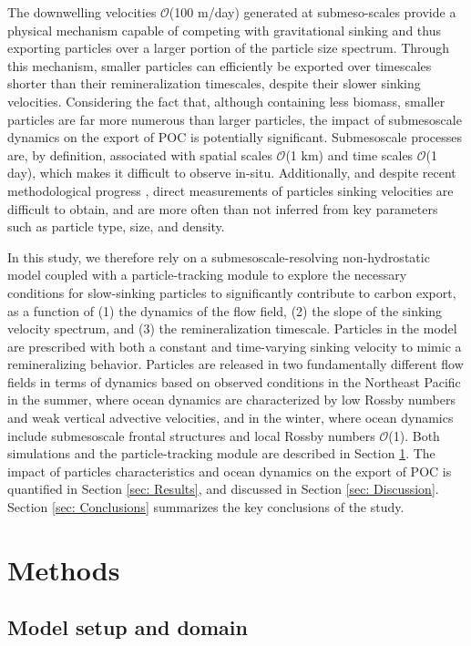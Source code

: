 \documentclass[draft,linenumbers]{agujournal2018}
\begin{document}
The downwelling velocities $\mathcal{O}$(100 m/day) generated at submeso-scales provide a physical mechanism capable of competing with gravitational sinking and thus exporting particles over a larger portion of the particle size spectrum. Through this mechanism, smaller particles can efficiently be exported over timescales shorter than their remineralization timescales, despite their slower sinking velocities. Considering the fact that, although containing less biomass, smaller particles are far more numerous than larger particles, the impact of submesoscale dynamics on the export of POC is potentially significant. Submesoscale processes are, by definition, associated with spatial scales $\mathcal{O}$(1 km) and time scales $\mathcal{O}$(1 day), which makes it difficult to observe in-situ. Additionally, and despite recent methodological progress \citep{McDonnell_2010}, direct measurements of particles sinking velocities are difficult to obtain, and are more often than not inferred from key parameters such as particle type, size, and density.

In this study, we therefore rely on a submesoscale-resolving non-hydrostatic model coupled with a particle-tracking module to explore the necessary conditions for slow-sinking particles to significantly contribute to carbon export, as a function of (1) the dynamics of the flow field, (2) the slope of the sinking velocity spectrum, and (3) the remineralization timescale. Particles in the model are prescribed with both a constant and time-varying sinking velocity to mimic a remineralizing behavior. Particles are released in two fundamentally different flow fields in terms of dynamics based on observed conditions in the Northeast Pacific in the summer, where ocean dynamics are characterized by low Rossby numbers and weak vertical advective velocities, and in the winter, where ocean dynamics include submesoscale frontal structures and local Rossby numbers $\mathcal{O}$(1). Both simulations and the particle-tracking module are described in Section \ref{sec: Methods}. The impact of particles characteristics and ocean dynamics on the export of POC is quantified in Section \ref{sec: Results}, and discussed in Section \ref{sec: Discussion}. Section \ref{sec: Conclusions} summarizes the key conclusions of the study.

\section{Methods}
\label{sec: Methods}
\subsection{Model setup and domain}
\end{document}
